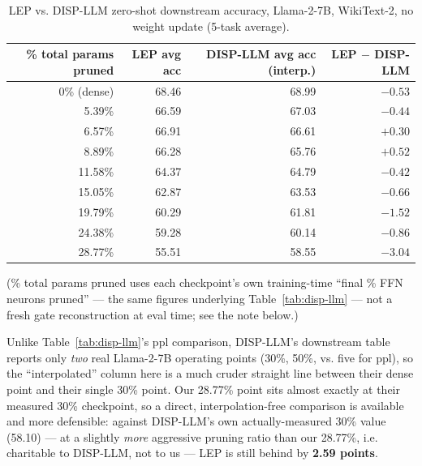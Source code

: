\documentclass[11pt]{article}
\begin{document}
\begin{table}[htbp]
\centering
\caption{LEP vs. DISP-LLM zero-shot downstream accuracy, Llama-2-7B, WikiText-2, no weight update (5-task average).}
\label{tab:downstream}
\begin{tabular}{@{}rrrr@{}}
\toprule
\% total params pruned & LEP avg acc & DISP-LLM avg acc (interp.) & LEP $-$ DISP-LLM \\
\midrule
0\% (dense) & 68.46 & 68.99 & $-0.53$ \\
5.39\%  & 66.59 & 67.03 & $-0.44$ \\
6.57\%  & 66.91 & 66.61 & $+0.30$ \\
8.89\%  & 66.28 & 65.76 & $+0.52$ \\
11.58\% & 64.37 & 64.79 & $-0.42$ \\
15.05\% & 62.87 & 63.53 & $-0.66$ \\
19.79\% & 60.29 & 61.81 & $-1.52$ \\
24.38\% & 59.28 & 60.14 & $-0.86$ \\
28.77\% & 55.51 & 58.55 & \textbf{$-3.04$} \\
\bottomrule
\end{tabular}
\end{table}

(\% total params pruned uses each checkpoint's own training-time ``final \% FFN
neurons pruned'' --- the same figures underlying Table~\ref{tab:disp-llm} --- not a fresh
gate reconstruction at eval time; see the note below.)

Unlike Table~\ref{tab:disp-llm}'s ppl comparison, DISP-LLM's downstream table reports only
\emph{two} real Llama-2-7B operating points (30\%, 50\%, vs. five for ppl), so the
``interpolated'' column here is a much cruder straight line between their
dense point and their single 30\% point. Our 28.77\% point sits almost exactly
at their measured 30\% checkpoint, so a direct, interpolation-free comparison
is available and more defensible: against DISP-LLM's own actually-measured
30\% value (58.10) --- at a slightly \emph{more} aggressive pruning ratio than our
28.77\%, i.e. charitable to DISP-LLM, not to us --- LEP is still behind by
\textbf{2.59 points}.
\end{document}
